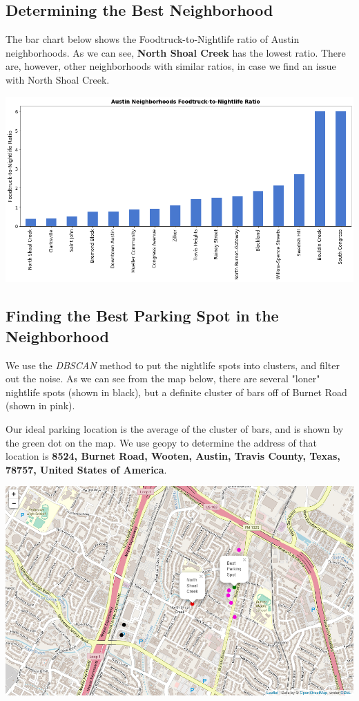 \documentclass{deagle}
\begin{document}
\subsection*{Determining the Best Neighborhood}

The bar chart below shows the Foodtruck-to-Nightlife ratio of Austin neighborhoods. As we can see, \textbf{North Shoal Creek} has the lowest ratio. There are, however, other neighborhoods with similar ratios, in case we find an issue with North Shoal Creek.

\begin{center}
\includegraphics[scale=0.45]{bar}
\end{center}

\subsection*{Finding the Best Parking Spot in the Neighborhood}

We use the \emph{DBSCAN} method to put the nightlife spots into clusters, and filter out the noise. As we can see from the map below, there are several "loner" nightlife spots (shown in black), but a definite cluster of bars off of Burnet Road (shown in pink).

Our ideal parking location is the average of the cluster of bars, and is shown by the green dot on the map. We use geopy to determine the address of that location is \textbf{8524, Burnet Road, Wooten, Austin, Travis County, Texas, 78757, United States of America}.

\begin{center}
    \includegraphics[scale=0.55]{map}
\end{center}
\end{document}
